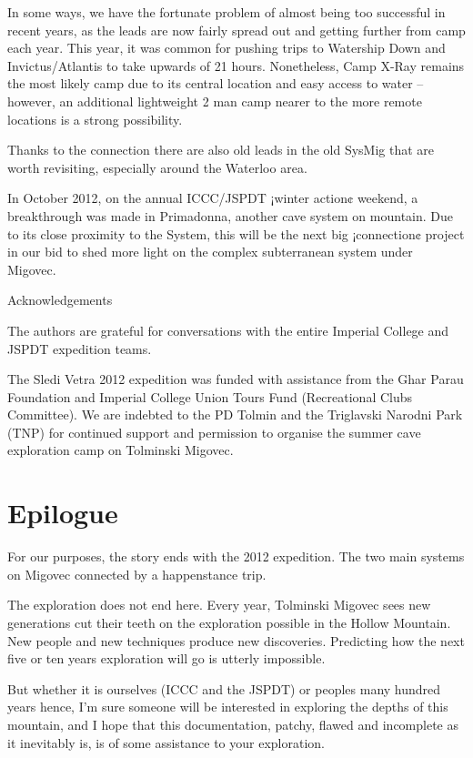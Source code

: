 In some ways, we have the fortunate problem of almost being too
successful in recent years, as the leads are now fairly spread out and
getting further from camp each year. This year, it was common for
pushing trips to Watership Down and Invictus/Atlantis to take upwards of
21 hours. Nonetheless, Camp X-Ray remains the most likely camp due to
its central location and easy access to water -- however, an additional
lightweight 2 man camp nearer to the more remote locations is a strong
possibility.

Thanks to the connection there are also old leads in the old SysMig that
are worth revisiting, especially around the Waterloo area.

In October 2012, on the annual ICCC/JSPDT ¡winter action¢ weekend, a
breakthrough was made in Primadonna, another cave system on mountain.
Due to its close proximity to the System, this will be the next big
¡connection¢ project in our bid to shed more light on the complex
subterranean system under Migovec.

Acknowledgements

The authors are grateful for conversations with the entire Imperial
College and JSPDT expedition teams.

The Sledi Vetra 2012 expedition was funded with assistance from the Ghar
Parau Foundation and Imperial College Union Tours Fund (Recreational
Clubs Committee). We are indebted to the PD Tolmin and the Triglavski
Narodni Park (TNP) for continued support and permission to organise the
summer cave exploration camp on Tolminski Migovec.

\hypertarget{epilogue}{%
\chapter{Epilogue}\label{epilogue}}

For our purposes, the story ends with the 2012 expedition. The two main
systems on Migovec connected by a happenstance trip.

The exploration does not end here. Every year, Tolminski Migovec sees
new generations cut their teeth on the exploration possible in the
Hollow Mountain. New people and new techniques produce new discoveries.
Predicting how the next five or ten years exploration will go is utterly
impossible.

But whether it is ourselves (ICCC and the JSPDT) or peoples many hundred
years hence, I'm sure someone will be interested in exploring the depths
of this mountain, and I hope that this documentation, patchy, flawed and
incomplete as it inevitably is, is of some assistance to your
exploration.

